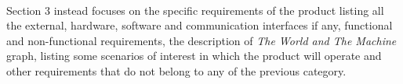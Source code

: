 		\paragraph*{}Section 3 instead focuses on the specific requirements of the product listing all the external, hardware, software and communication interfaces if any, functional and non-functional requirements, the description of \emph{The World and The Machine} graph, listing some scenarios of interest in which the product will operate and other requirements that do not belong to any of the previous category. 
	
	